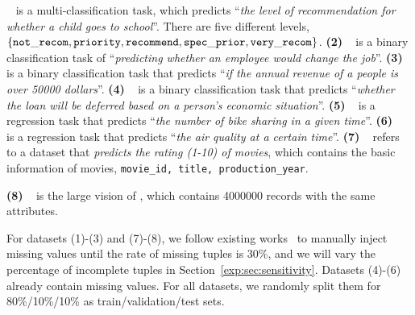 ~\cite{nursery} is a multi-classification task, which  predicts ``{\it the level of recommendation for whether a child goes to school}''. There are five different levels, \ie $\{ {\tt not\_recom, priority, recommend, spec\_prior, very\_recom} \}$. %
{\bf (2) \hr}~\cite{chai2022selective} is a binary classification task of ``{\it predicting whether an employee would change the job}''.  %
{\bf (3) \adult}~\cite{adult} is a binary classification task that predicts ``{\it if the annual revenue of a people is over 50000 dollars}''. %
{\bf (4) \credit}~\cite{kaggle} is a binary classification task that predicts ``{\it whether the loan will be deferred based on a person's economic situation}''.  %
{\bf (5) \bike}~\cite{bike} is a regression task that predicts ``{\it the number of bike sharing in a given time}''. %
{\bf (6) \air}~\cite{auctus} is a regression task that predicts ``{\it the air quality at a certain time}''. %
{\bf (7) \imdb}~\cite{DBLP:journals/pvldb/LeisGMBK015} refers to a dataset that \textit{predicts the rating (1-10) of movies}, which contains the basic information of movies, \eg \texttt{movie\_id, title, production\_year}.

{\bf (8) \imdbl}~\cite{DBLP:journals/pvldb/LeisGMBK015} is the large vision of \imdb, which contains 4000000 records with the same attributes.


For datasets (1)-(3) and (7)-(8), we follow existing works~\cite{DBLP:journals/jbd/KhanH20,DBLP:conf/icml/YoonJS18,DBLP:conf/mlsys/WuZIR20} to manually inject missing values until the  rate of missing tuples is 30\%, and we will vary the percentage of incomplete tuples in Section~\ref{exp:sec:sensitivity}. Datasets (4)-(6) already contain missing values. For all datasets, we randomly split them for 80\%/10\%/10\% as train/validation/test sets.






